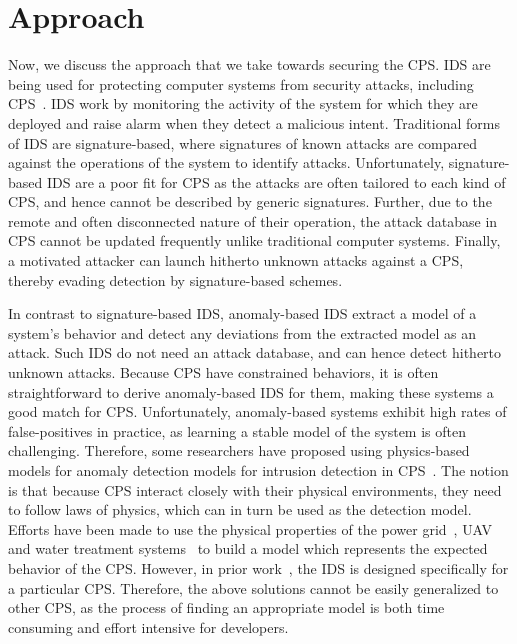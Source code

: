 \section{Approach}
\label{sec:Approach}
Now, we discuss the approach that we take towards securing the \ac{CPS}. \ac{IDS} are being used for protecting computer systems from security attacks, including CPS~\cite{lu2015towards, mitchell2015behavior, bernieri2016testbed}. \ac{IDS} work by monitoring the activity of the system for which they are deployed and raise alarm when they detect a malicious intent. Traditional forms of \ac{IDS} are signature-based, where signatures of known attacks are compared against the operations of the system to identify attacks. Unfortunately, signature-based \ac{IDS} are a poor fit for \ac{CPS} as the attacks are often tailored to each kind of \ac{CPS}, and hence cannot be described by generic signatures. Further, due to the remote and often disconnected nature of their operation, the attack database in \ac{CPS} cannot be updated frequently unlike traditional computer systems. Finally, a motivated attacker can launch hitherto unknown attacks against a \ac{CPS}, thereby evading detection by signature-based schemes. 

In contrast to signature-based \ac{IDS}, anomaly-based \ac{IDS} extract a model of a system's behavior and detect any deviations from the extracted model as an attack. Such \ac{IDS} do not need an attack database, and can hence detect hitherto unknown attacks. Because \ac{CPS} have constrained behaviors, it is often straightforward to derive anomaly-based \ac{IDS} for them, making these systems a good match for \ac{CPS}. Unfortunately, anomaly-based systems exhibit high rates of false-positives in practice, as learning a stable model of the system is often challenging. Therefore, some researchers have proposed using physics-based models for anomaly detection models for intrusion detection in \ac{CPS}~\cite{mitchell2012specification,mitchell2014adaptive,choudhari2013stability,chen2018learning,zohrevand2016hidden}. The notion is that because \ac{CPS} interact closely with their physical environments, they need to follow laws of physics, which can in turn be used as the detection model. 
Efforts have been made to use the physical properties of the power grid~\cite{choudhari2013stability,paul2014unified}, \ac{UAV}~\cite{mitchell2012specification} and water treatment systems~\cite{adepu2016using} to build a model which represents the expected behavior of the \ac{CPS}. However, in prior work~\cite{mitchell2012specification,mitchell2014adaptive,choudhari2013stability,chen2018learning,zohrevand2016hidden, adepu2016using, paul2014unified}, the \ac{IDS} is designed specifically for a particular \ac{CPS}. Therefore, the above solutions cannot be easily generalized to other \ac{CPS}, as the process of finding an appropriate model is both time consuming and effort intensive for developers. 

